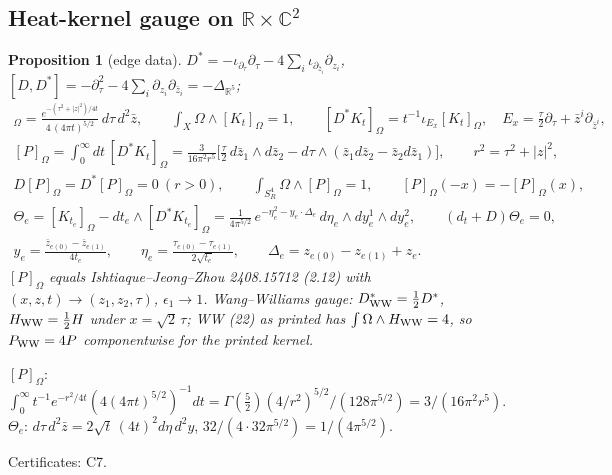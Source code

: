 \documentclass[10pt,a4paper]{article}
\numberwithin{equation}{section}
\newtheorem{proposition}[theorem]{Proposition}
\theoremstyle{definition}
\theoremstyle{remark}
\newcommand{\zb}{\bar z}
\newcommand{\cert}[1]{\par\noindent\textup{Certificates: #1.}\par}
\begin{document}
\subsection{\texorpdfstring{Heat-kernel gauge on $\mathbb R\times\mathbb C^2$}{Heat-kernel gauge on R x C2}}\label{sec-gauge}

\begin{proposition}[edge data]\label{prop-gauge}
$D^*=-\iota_{\partial_\tau}\partial_\tau-4\sum_i\iota_{\partial_{\zb_i}}\partial_{z_i}$, $[D,D^*]=-\partial_\tau^2-4\sum_i\partial_{z_i}\partial_{\zb_i}=-\Delta_{\mathbb R^5}$;
\begin{gather}
[K_t]_\Omega=\frac{e^{-(\tau^2+|z|^2)/4t}}{4\,(4\pi t)^{5/2}}\,d\tau\,d^2\zb,\qquad \int_X\Omega\wedge[K_t]_\Omega=1,\qquad [D^*K_t]_\Omega=t^{-1}\iota_{E_x}[K_t]_\Omega,\quad E_x=\tfrac\tau2\partial_\tau+\zb^i\partial_{\zb^i},\\
[P]_\Omega=\int_0^\infty dt\,[D^*K_t]_\Omega=\frac{3}{16\pi^2r^5}\Big[\frac\tau2\,d\zb_1\wedge d\zb_2-d\tau\wedge(\zb_1d\zb_2-\zb_2d\zb_1)\Big],\qquad r^2=\tau^2+|z|^2,\\
D[P]_\Omega=D^*[P]_\Omega=0\ (r>0),\qquad \int_{S^4_R}\Omega\wedge[P]_\Omega=1,\qquad [P]_\Omega(-x)=-[P]_\Omega(x),\\
\Theta_e=[K_{t_e}]_\Omega-dt_e\wedge[D^*K_{t_e}]_\Omega=\frac1{4\pi^{5/2}}\,e^{-\eta_e^2-y_e\cdot\Delta_e}\,d\eta_e\wedge dy^1_e\wedge dy^2_e,\qquad(d_t+D)\Theta_e=0,\\
y_e=\frac{\zb_{e(0)}-\zb_{e(1)}}{4t_e},\qquad \eta_e=\frac{\tau_{e(0)}-\tau_{e(1)}}{2\sqrt{t_e}},\qquad \Delta_e=z_{e(0)}-z_{e(1)}+z_e .
\end{gather}
$[P]_\Omega$ equals Ishtiaque--Jeong--Zhou 2408.15712 \cite{IJZ} (2.12) with $(x,z,t)\to(z_1,z_2,\tau)$, $\epsilon_1\to1$. Wang--Williams gauge: $D^*_{\rm WW}=\frac12D^*$, $H_{\rm WW}=\frac12H$ under $x=\sqrt2\,\tau$; WW (22) as printed has $\int\Omega\wedge H_{\rm WW}=4$, so $P_{\rm WW}=4P$ componentwise for the printed kernel.
\end{proposition}
$[P]_\Omega$: $\int_0^\infty t^{-1}e^{-r^2/4t}(4(4\pi t)^{5/2})^{-1}dt=\Gamma(\frac52)(4/r^2)^{5/2}/(128\pi^{5/2})=3/(16\pi^2r^5)$. $\Theta_e$: $d\tau\,d^2\zb=2\sqrt t\,(4t)^2d\eta\,d^2y$, $32/(4\cdot32\pi^{5/2})=1/(4\pi^{5/2})$.
\cert{C7}
\end{document}
